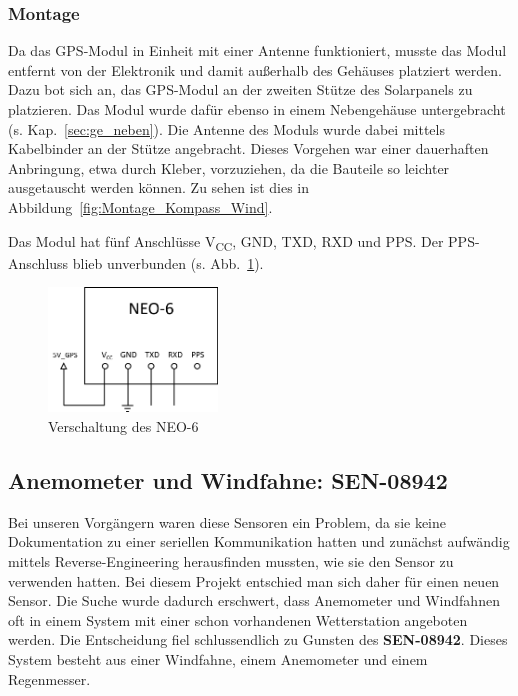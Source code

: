 \subsubsection{Montage}
Da das GPS-Modul in Einheit mit einer Antenne funktioniert, musste das Modul entfernt von der Elektronik und damit außerhalb des Gehäuses platziert werden. Dazu bot sich an, das GPS-Modul an der zweiten Stütze des Solarpanels zu platzieren. Das Modul wurde dafür ebenso in einem Nebengehäuse untergebracht (s. Kap.~\ref{sec:ge_neben}). Die Antenne des Moduls wurde dabei mittels Kabelbinder an der Stütze angebracht. Dieses Vorgehen war einer dauerhaften Anbringung, etwa durch Kleber, vorzuziehen, da die Bauteile so leichter ausgetauscht werden können. Zu sehen ist dies in Abbildung~\ref{fig:Montage_Kompass_Wind}.

Das Modul hat fünf Anschlüsse V\textsubscript{CC}, GND, TXD, RXD und PPS. Der PPS-Anschluss blieb unverbunden (s. Abb.~\ref{fig:NEO-6_Plan}).

\begin{figure}[H]
  \centering
  \includegraphics[width=0.4\textwidth]{./img/NEO-6_Plan.png}
  \caption{Verschaltung des NEO-6}\label{fig:NEO-6_Plan}
\end{figure}

\subsection{Anemometer und Windfahne: SEN-08942}
Bei unseren Vorgängern waren diese Sensoren ein Problem, da sie keine Dokumentation zu einer seriellen Kommunikation hatten und zunächst aufwändig mittels Reverse-Engineering herausfinden mussten, wie sie den Sensor zu verwenden hatten. Bei diesem Projekt entschied man sich daher für einen neuen Sensor. Die Suche wurde dadurch erschwert, dass Anemometer und Windfahnen oft in einem System mit einer schon vorhandenen Wetterstation angeboten werden. Die Entscheidung fiel schlussendlich zu Gunsten des \textbf{SEN-08942}. Dieses System besteht aus einer Windfahne, einem Anemometer und einem Regenmesser.

